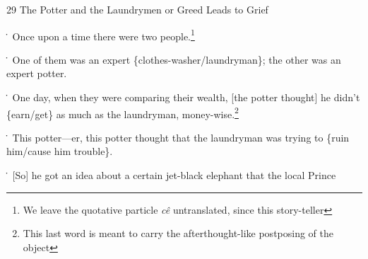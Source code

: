
29 The Potter and the Laundrymen or Greed Leads to Grief

\. Once upon a time there were two people.\footnote{We leave the quotative particle \textit{cê} untranslated, since this story-teller}

\. One of them was an expert \{clothes-washer/laundryman\}; the other was an expert
potter.

\. One day, when they were comparing their wealth, [the potter thought] he didn't
\{earn/get\} as much as the laundryman, money-wise.\footnote{This last word is meant to carry the afterthought-like postposing of the object}

\. This potter---er, this potter thought that the laundryman was trying to \{ruin
him/cause him trouble\}.

\. [So] he got an idea about a certain jet-black elephant that the local Prince
